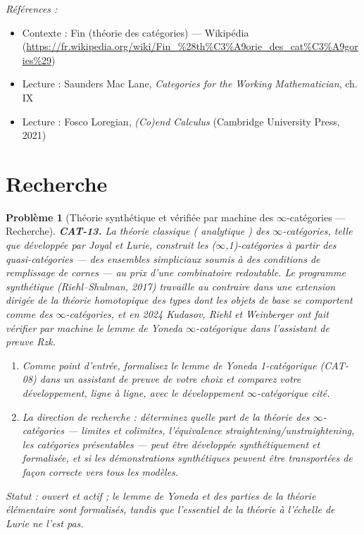 \documentclass[11pt]{article}
\newtheorem{problem}{Problème}
\newenvironment{refs}{\par\small\noindent\emph{Références :}\begin{itemize}\setlength\itemsep{0pt}}{\end{itemize}\normalsize}
\begin{document}
\begin{refs}
\item Contexte : Fin (théorie des catégories) --- Wikipédia (\url{https://fr.wikipedia.org/wiki/Fin_%28th%C3%A9orie_des_cat%C3%A9gories%29})
\item Lecture : Saunders Mac Lane, \textit{Categories for the Working Mathematician}, ch. IX
\item Lecture : Fosco Loregian, \textit{(Co)end Calculus} (Cambridge University Press, 2021)
\end{refs}

\bigskip


\section*{Recherche}

\begin{problem}[{Théorie synthétique et vérifiée par machine des $\infty$-catégories --- Recherche}]
\textbf{CAT-13.} La théorie classique (\og{} analytique \fg{}) des $\infty$-catégories, telle que développée
par Joyal et Lurie, construit les ($\infty$,1)-catégories à partir des quasi-catégories --- des ensembles
simpliciaux soumis à des conditions de remplissage de cornes --- au prix d'une combinatoire
redoutable. Le programme \textit{synthétique} (Riehl--Shulman, 2017) travaille au contraire dans une
extension dirigée de la théorie homotopique des types dont les objets de base se comportent comme
des $\infty$-catégories, et en 2024 Kudasov, Riehl et Weinberger ont fait vérifier par machine le lemme
de Yoneda $\infty$-catégorique dans l'assistant de preuve Rzk.
\begin{enumerate}
\item[(a)] Comme point d'entrée, formalisez le lemme de Yoneda 1-catégorique (CAT-08) dans un assistant
de preuve de votre choix et comparez votre développement, ligne à ligne, avec le développement
$\infty$-catégorique cité.
\item[(b)] La direction de recherche : déterminez quelle part de la théorie des $\infty$-catégories --- limites et
colimites, l'équivalence straightening/unstraightening, les catégories présentables --- peut être
développée synthétiquement et formalisée, et si les démonstrations synthétiques peuvent être
transportées de façon correcte vers tous les modèles.
\end{enumerate}
\textit{Statut : ouvert et actif ; le lemme de Yoneda et des parties de la théorie élémentaire sont
formalisés, tandis que l'essentiel de la théorie à l'échelle de Lurie ne l'est pas.}
\end{problem}
\end{document}
